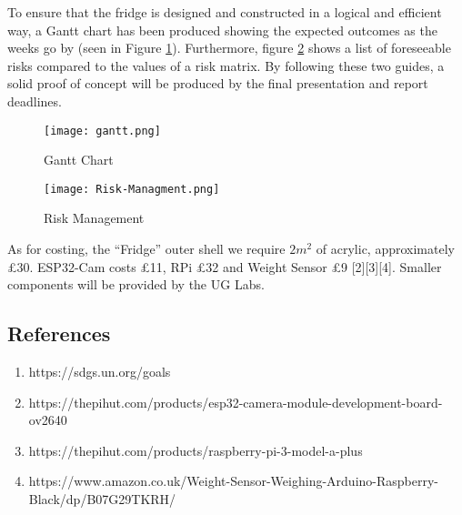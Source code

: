 To ensure that the fridge is designed and constructed in a logical and efficient way, 
a Gantt chart has been produced showing the expected outcomes as the weeks go by (seen in Figure \ref{fig:gantt}). 
Furthermore, figure \ref{fig:risk_management} shows a list of foreseeable risks compared to the values of a risk matrix. 
By following these two guides, a solid proof of concept will be produced by the final presentation and report deadlines.

\begin{figure}[H]        
    \centering
    \texttt{[image: gantt.png]}
    \caption{Gantt Chart}
    \label{fig:gantt}
\end{figure} 

\begin{figure}[H]        
    \centering
    \texttt{[image: Risk-Managment.png]}
    \caption{Risk Management}
    \label{fig:risk_management}
\end{figure} 

As for costing, the “Fridge” outer shell we require $2m^2$ of acrylic, approximately £30.
ESP32-Cam costs £11, RPi £32 and Weight Sensor £9 [2][3][4]. Smaller components will be provided by the UG Labs. 

\subsection{References}

\begin{enumerate}
    \item https://sdgs.un.org/goals      
    \item https://thepihut.com/products/esp32-camera-module-development-board-ov2640
    \item https://thepihut.com/products/raspberry-pi-3-model-a-plus
    \item https://www.amazon.co.uk/Weight-Sensor-Weighing-Arduino-Raspberry-Black/dp/B07G29TKRH/
\end{enumerate}
